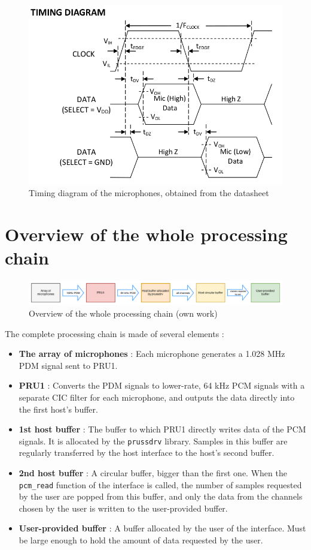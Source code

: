\documentclass[]{report}
\providecommand{\tightlist}{%
	\setlength{\itemsep}{0pt}\setlength{\parskip}{0pt}}
\begin{document}
\begin{figure}[H]
\centering
\includegraphics[width=0.6\linewidth]{Pictures/timing_diagram.png}
\caption{Timing diagram of the microphones, obtained from the datasheet}
\end{figure}


\hypertarget{overview-of-the-whole-processing-chain}{%
\section{Overview of the whole processing
chain}\label{overview-of-the-whole-processing-chain}}

\begin{figure}[H]
\centering
\includegraphics[width=1.0\linewidth]{Pictures/PRU_processing_chain.png}
\caption{Overview of the whole processing chain (own work)}
\end{figure}

The complete processing chain is made of several elements :

\begin{itemize}
\tightlist
\item
  \textbf{The array of microphones} : Each microphone generates a 1.028 MHz PDM signal sent to PRU1.
\item
  \textbf{PRU1} : Converts the PDM signals to lower-rate, 64 kHz PCM signals with a separate CIC filter for each microphone, and outputs the data directly into the first host's buffer.
\item
  \textbf{1st host buffer} : The buffer to which PRU1 directly writes data of the PCM signals. It is allocated by the \texttt{prussdrv} library. Samples in this buffer are regularly transferred by the host interface to the host's second buffer.
\item
  \textbf{2nd host buffer} : A circular buffer, bigger than the first one. When the \texttt{pcm\_read} function of the interface is called, the number of samples requested by the user are popped from this buffer, and only the data from the channels chosen by the user is written to the user-provided buffer.
\item
  \textbf{User-provided buffer} : A buffer allocated by the user of the interface. Must be large enough to hold the amount of data requested by the user.
\end{itemize}
\end{document}
